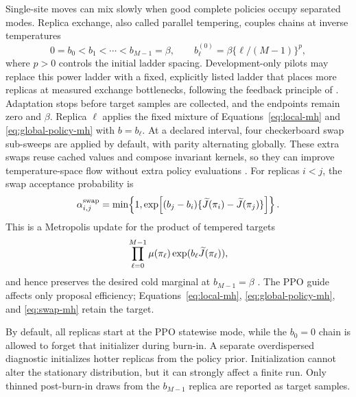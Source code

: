 Single-site moves can mix slowly when good complete policies occupy separated
modes.  Replica exchange, also called parallel tempering, couples chains at
inverse temperatures
\begin{equation}
  0=b_0 < b_1 < \cdots < b_{M-1}=\beta,
  \qquad
  b_\ell^{(0)}=\beta\{\ell/(M-1)\}^p,
  \label{eq:temperature-ladder}
\end{equation}
where \(p>0\) controls the initial ladder spacing.  Development-only pilots may
replace this power ladder with a fixed, explicitly listed ladder that places
more replicas at measured exchange bottlenecks, following the feedback
principle of \citet{katzgraberEtAl2006}.  Adaptation stops before target samples
are collected, and the endpoints remain zero and \(\beta\).  Replica \(\ell\)
applies the fixed mixture of Equations~\eqref{eq:local-mh} and
\eqref{eq:global-policy-mh} with \(b=b_\ell\).  At a declared interval, four
checkerboard swap sub-sweeps are applied by default, with parity alternating
globally.  These extra swaps reuse cached values and compose invariant kernels,
so they can improve temperature-space flow without extra policy evaluations
\citep{choderaShirts2011}.  For replicas \(i<j\), the swap acceptance probability is
\begin{equation}
  \alpha_{i,j}^{\mathrm{swap}}
  = \min\!\left\{1,
      \exp\!\left[(b_j-b_i)
        \{\widetilde J(\pi_i)-\widetilde J(\pi_j)\}\right]
    \right\}.
  \label{eq:swap-mh}
\end{equation}
This is a Metropolis update for the product of tempered targets
\[
  \prod_{\ell=0}^{M-1}\mu(\pi_\ell)
  \exp(b_\ell\widetilde J(\pi_\ell)),
\]
and hence preserves the desired cold marginal at \(b_{M-1}=\beta\)
\citep{geyer1991}.  The PPO guide affects only proposal efficiency;
Equations~\eqref{eq:local-mh}, \eqref{eq:global-policy-mh}, and
\eqref{eq:swap-mh} retain the target.

By default, all replicas start at the PPO statewise mode, while the
\(b_0=0\) chain is allowed to forget that initializer during burn-in.  A
separate overdispersed diagnostic initializes hotter replicas from the policy
prior.  Initialization cannot alter the stationary distribution, but it can
strongly affect a finite run.  Only thinned post-burn-in draws from the
\(b_{M-1}\) replica are reported as target samples.


